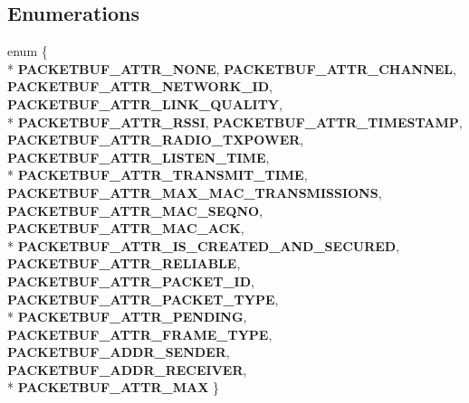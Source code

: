 \subsection*{Enumerations}
\begin{DoxyCompactItemize}
\item 
\hypertarget{group__packetbuf_ga61dadd085c1777f559549e05962b2c9e}{}enum \{ \\*
{\bfseries P\+A\+C\+K\+E\+T\+B\+U\+F\+\_\+\+A\+T\+T\+R\+\_\+\+N\+O\+N\+E}, 
{\bfseries P\+A\+C\+K\+E\+T\+B\+U\+F\+\_\+\+A\+T\+T\+R\+\_\+\+C\+H\+A\+N\+N\+E\+L}, 
{\bfseries P\+A\+C\+K\+E\+T\+B\+U\+F\+\_\+\+A\+T\+T\+R\+\_\+\+N\+E\+T\+W\+O\+R\+K\+\_\+\+I\+D}, 
{\bfseries P\+A\+C\+K\+E\+T\+B\+U\+F\+\_\+\+A\+T\+T\+R\+\_\+\+L\+I\+N\+K\+\_\+\+Q\+U\+A\+L\+I\+T\+Y}, 
\\*
{\bfseries P\+A\+C\+K\+E\+T\+B\+U\+F\+\_\+\+A\+T\+T\+R\+\_\+\+R\+S\+S\+I}, 
{\bfseries P\+A\+C\+K\+E\+T\+B\+U\+F\+\_\+\+A\+T\+T\+R\+\_\+\+T\+I\+M\+E\+S\+T\+A\+M\+P}, 
{\bfseries P\+A\+C\+K\+E\+T\+B\+U\+F\+\_\+\+A\+T\+T\+R\+\_\+\+R\+A\+D\+I\+O\+\_\+\+T\+X\+P\+O\+W\+E\+R}, 
{\bfseries P\+A\+C\+K\+E\+T\+B\+U\+F\+\_\+\+A\+T\+T\+R\+\_\+\+L\+I\+S\+T\+E\+N\+\_\+\+T\+I\+M\+E}, 
\\*
{\bfseries P\+A\+C\+K\+E\+T\+B\+U\+F\+\_\+\+A\+T\+T\+R\+\_\+\+T\+R\+A\+N\+S\+M\+I\+T\+\_\+\+T\+I\+M\+E}, 
{\bfseries P\+A\+C\+K\+E\+T\+B\+U\+F\+\_\+\+A\+T\+T\+R\+\_\+\+M\+A\+X\+\_\+\+M\+A\+C\+\_\+\+T\+R\+A\+N\+S\+M\+I\+S\+S\+I\+O\+N\+S}, 
{\bfseries P\+A\+C\+K\+E\+T\+B\+U\+F\+\_\+\+A\+T\+T\+R\+\_\+\+M\+A\+C\+\_\+\+S\+E\+Q\+N\+O}, 
{\bfseries P\+A\+C\+K\+E\+T\+B\+U\+F\+\_\+\+A\+T\+T\+R\+\_\+\+M\+A\+C\+\_\+\+A\+C\+K}, 
\\*
{\bfseries P\+A\+C\+K\+E\+T\+B\+U\+F\+\_\+\+A\+T\+T\+R\+\_\+\+I\+S\+\_\+\+C\+R\+E\+A\+T\+E\+D\+\_\+\+A\+N\+D\+\_\+\+S\+E\+C\+U\+R\+E\+D}, 
{\bfseries P\+A\+C\+K\+E\+T\+B\+U\+F\+\_\+\+A\+T\+T\+R\+\_\+\+R\+E\+L\+I\+A\+B\+L\+E}, 
{\bfseries P\+A\+C\+K\+E\+T\+B\+U\+F\+\_\+\+A\+T\+T\+R\+\_\+\+P\+A\+C\+K\+E\+T\+\_\+\+I\+D}, 
{\bfseries P\+A\+C\+K\+E\+T\+B\+U\+F\+\_\+\+A\+T\+T\+R\+\_\+\+P\+A\+C\+K\+E\+T\+\_\+\+T\+Y\+P\+E}, 
\\*
{\bfseries P\+A\+C\+K\+E\+T\+B\+U\+F\+\_\+\+A\+T\+T\+R\+\_\+\+P\+E\+N\+D\+I\+N\+G}, 
{\bfseries P\+A\+C\+K\+E\+T\+B\+U\+F\+\_\+\+A\+T\+T\+R\+\_\+\+F\+R\+A\+M\+E\+\_\+\+T\+Y\+P\+E}, 
{\bfseries P\+A\+C\+K\+E\+T\+B\+U\+F\+\_\+\+A\+D\+D\+R\+\_\+\+S\+E\+N\+D\+E\+R}, 
{\bfseries P\+A\+C\+K\+E\+T\+B\+U\+F\+\_\+\+A\+D\+D\+R\+\_\+\+R\+E\+C\+E\+I\+V\+E\+R}, 
\\*
{\bfseries P\+A\+C\+K\+E\+T\+B\+U\+F\+\_\+\+A\+T\+T\+R\+\_\+\+M\+A\+X}
 \}\label{group__packetbuf_ga61dadd085c1777f559549e05962b2c9e}


\end{DoxyCompactItemize}
